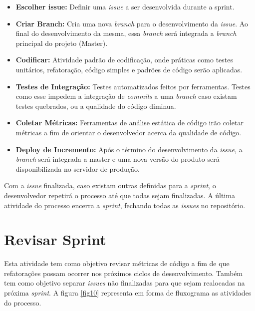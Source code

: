 \begin{itemize}

	\item \textbf{Escolher issue:} Definir uma \textit{issue} a ser desenvolvida durante a sprint.

	\item \textbf{Criar Branch:} Cria uma nova \textit{branch} para o desenvolvimento da \textit{issue}. Ao final do desenvolvimento da mesma, essa \textit{branch} será integrada a \textit{branch} principal do projeto (Master).

	\item \textbf{Codificar:} Atividade padrão de codificação, onde práticas como testes unitários, refatoração, código simples e padrões de código serão aplicadas.

	\item \textbf{Testes de Integração:} Testes automatizados feitos por ferramentas. Testes como esse impedem a integração de \textit{commits} a uma \textit{branch} caso existam testes quebrados, ou a qualidade do código diminua.

	\item \textbf{Coletar Métricas:} Ferramentas de análise estática de código  irão coletar métricas a fim de orientar o desenvolvedor acerca da qualidade de código.

	\item \textbf{Deploy de Incremento:} Após o término do desenvolvimento da \textit{issue}, a \textit{branch} será integrada a master e uma nova versão do produto será disponibilizada no servidor de produção.

\end{itemize}

Com a \textit{issue} finalizada, caso existam outras definidas para a \textit{sprint}, o desenvolvedor repetirá o processo até que todas sejam finalizadas. A última atividade do processo encerra a \textit{sprint}, fechando todas as \textit{issues} no repositório.

\section{Revisar Sprint}

Esta atividade tem como objetivo revisar métricas de código a fim de que refatorações possam ocorrer nos próximos ciclos de desenvolvimento. Também tem como objetivo separar \textit{issues} não finalizadas para que sejam realocadas na próxima \textit{sprint}. A figura \ref{fig10} representa em forma de fluxograma as atividades do processo.

